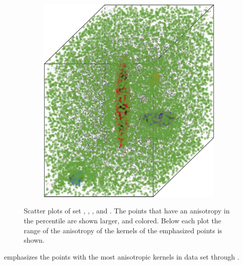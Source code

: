 \begin{figure}
\begin{subfigure}{0.23\textwidth}
				\caption{}
				\label{fig:discussion:anisotropy:ferdosi3}
			\end{subfigure}
			\begin{subfigure}{0.23\textwidth}
				\centering
				\includegraphics[keepaspectratio=true, width=\textwidth, height=0.23\textheight]{discussion/img/baakman_3_60000_anisotropy.png}
				\caption{}
				\label{fig:discussion:anisotropy:baakman3}
			\end{subfigure}
			\caption{Scatter plots of set
				 \ferdosiTwo, %
				 \baakmanTwo, %
				 \ferdosiThree, and %
				 \baakmanThree. %
				The points that have an anisotropy in the  percentile are shown larger, and colored. Below each plot the range of the anisotropy of the kernels of the emphasized points is shown.}
			\label{fig:discussion:anisotropy:multisphere}
		\end{figure}
		 emphasizes the points with the most anisotropic kernels in data set \ferdosiTwo through \baakmanThree.
